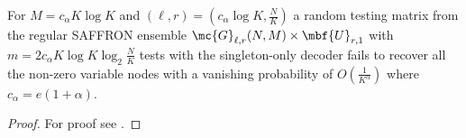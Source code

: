\documentclass[conference,twocolumn]{IEEEtran}
\def\ceps{c_{\epsilon}}
\def\proofgap{-3ex}
\begin{document}
{\begin{theorem}
For $M=c_\alpha K \log K$ and $(\ell,r)=(c_\alpha \log K,\frac{N}{K})$ a random testing matrix from the regular SAFFRON ensemble $\mc{G}_{\ell,r}(N,M)\times \mbf{U}_{r,1}$ with $m=2c_\alpha K\log K \log_2 \frac{N}{K}$ tests with the singleton-only decoder fails to recover all the non-zero variable nodes with a vanishing probability of $O(\frac{1}{K^{\alpha}})$ where $c_\alpha=e(1+\alpha)$.
%
\end{theorem}
\vspace{\proofgap}
\begin{proof}
For proof see .%
%
\end{proof}

}
\end{document}
